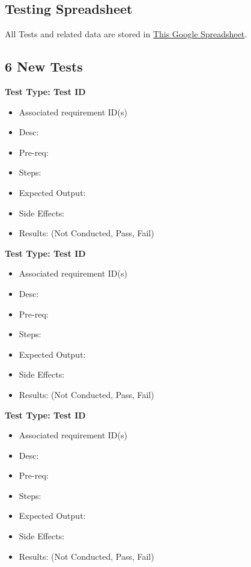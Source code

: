 \subsection*{Testing Spreadsheet}
All Tests and related data are stored in 
\href{https://docs.google.com/spreadsheets/d/1BoIIdfYPEM98kANtgATMmwdYYAYXyrwbqOqgZ7D_9U4/edit?usp=sharing}
{This Google Spreadsheet}.

\subsection*{6 New Tests}

\textbf{Test Type: Test ID}
\begin{itemize}
    \item Associated requirement ID(s)
    \item Desc: 
    \item Pre-req: 
    \item Steps: 
    \item Expected Output: 
    \item Side Effects: 
    \item Results: (Not Conducted, Pass, Fail)
\end{itemize}

\smallskip\textbf{Test Type: Test ID}
\begin{itemize}
    \item Associated requirement ID(s)
    \item Desc: 
    \item Pre-req: 
    \item Steps: 
    \item Expected Output: 
    \item Side Effects: 
    \item Results: (Not Conducted, Pass, Fail)
\end{itemize}

\smallskip\textbf{Test Type: Test ID}
\begin{itemize}
    \item Associated requirement ID(s)
    \item Desc: 
    \item Pre-req: 
    \item Steps: 
    \item Expected Output: 
    \item Side Effects: 
    \item Results: (Not Conducted, Pass, Fail)
\end{itemize}


